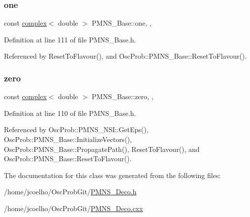 \subsubsection{\texorpdfstring{one}{one}}
{\footnotesize\ttfamily const \hyperlink{classOscProb_1_1PMNS__Base_ae86ec4718808ce9d02e5f5b4226714ab}{complex}$<$ double $>$ P\+M\+N\+S\+\_\+\+Base\+::one\hspace{0.3cm}{\ttfamily [static]}, {\ttfamily [protected]}, {\ttfamily [inherited]}}



Definition at line 111 of file P\+M\+N\+S\+\_\+\+Base.\+h.



Referenced by Reset\+To\+Flavour(), and Osc\+Prob\+::\+P\+M\+N\+S\+\_\+\+Base\+::\+Reset\+To\+Flavour().

\mbox{\label{classOscProb_1_1PMNS__Base_a5c31ed4593cf95feb36fb80c1850d25e}} 
\subsubsection{\texorpdfstring{zero}{zero}}
{\footnotesize\ttfamily const \hyperlink{classOscProb_1_1PMNS__Base_ae86ec4718808ce9d02e5f5b4226714ab}{complex}$<$ double $>$ P\+M\+N\+S\+\_\+\+Base\+::zero\hspace{0.3cm}{\ttfamily [static]}, {\ttfamily [protected]}, {\ttfamily [inherited]}}



Definition at line 110 of file P\+M\+N\+S\+\_\+\+Base.\+h.



Referenced by Osc\+Prob\+::\+P\+M\+N\+S\+\_\+\+N\+S\+I\+::\+Get\+Eps(), Osc\+Prob\+::\+P\+M\+N\+S\+\_\+\+Base\+::\+Initialize\+Vectors(), Osc\+Prob\+::\+P\+M\+N\+S\+\_\+\+Base\+::\+Propagate\+Path(), Reset\+To\+Flavour(), and Osc\+Prob\+::\+P\+M\+N\+S\+\_\+\+Base\+::\+Reset\+To\+Flavour().



The documentation for this class was generated from the following files\+:\begin{DoxyCompactItemize}
\item 
/home/jcoelho/\+Osc\+Prob\+Git/\hyperlink{PMNS__Deco_8h}{P\+M\+N\+S\+\_\+\+Deco.\+h}\item 
/home/jcoelho/\+Osc\+Prob\+Git/\hyperlink{PMNS__Deco_8cxx}{P\+M\+N\+S\+\_\+\+Deco.\+cxx}\end{DoxyCompactItemize}
